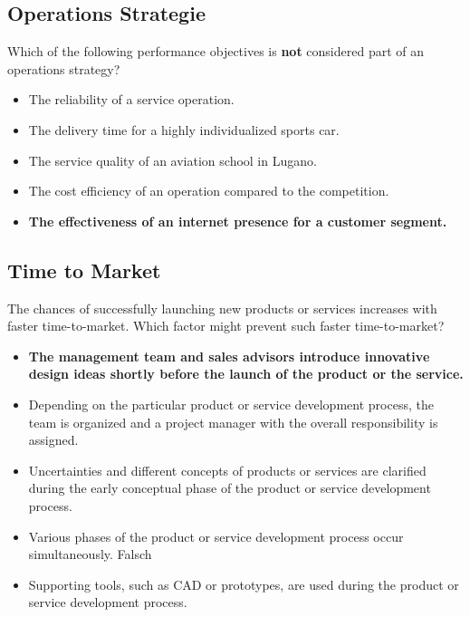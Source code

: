 \subsection{Operations Strategie}
Which of the following performance objectives is \textbf{not} considered part of an operations strategy?
\begin{itemize}
\item   The reliability of a service operation.
\item   The delivery time for a highly individualized sports car.
\item   The service quality of an aviation school in Lugano.
\item   The cost efficiency of an operation compared to the competition.
\item  \textbf{ The effectiveness of an internet presence for a customer segment.}
\end{itemize}
\subsection{Time to Market}
The chances of successfully launching new products or services increases with faster time-to-market. Which factor might prevent such faster time-to-market?
\begin{itemize}
\item   \textbf{The management team and sales advisors introduce innovative design ideas shortly before the launch of the product or the service.}
\item   Depending on the particular product or service development process, the team is organized and a project manager with the overall responsibility is assigned.
\item   Uncertainties and different concepts of products or services are clarified during the early conceptual phase of the product or service development process.
\item   Various phases of the product or service development process occur simultaneously. Falsch
\item Supporting tools, such as CAD or prototypes, are used during the product or service development process.
\end{itemize}

